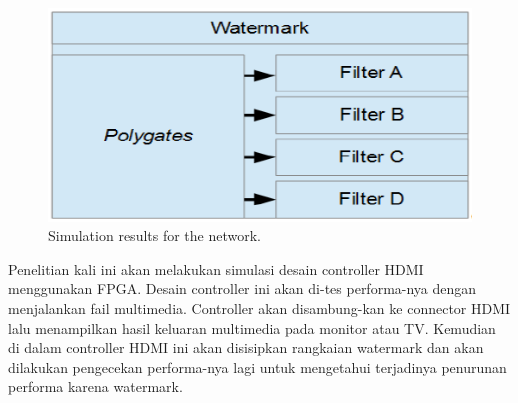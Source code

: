 \begin{figure}[h]
	\centering
	\includegraphics[scale=0.8]{images/box}
	\caption{Simulation results for the network.}
	\label{fig_sim}
\end{figure}

Penelitian kali ini akan melakukan simulasi desain controller HDMI
menggunakan FPGA. Desain controller ini akan di-tes performa-nya dengan
menjalankan fail multimedia. Controller akan disambung-kan ke connector
HDMI lalu menampilkan hasil keluaran multimedia pada monitor atau TV.
Kemudian di dalam controller HDMI ini akan disisipkan rangkaian watermark
dan akan dilakukan pengecekan performa-nya lagi untuk mengetahui terjadinya
penurunan performa karena watermark.

